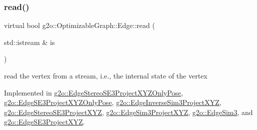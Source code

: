 \mbox{\label{classg2o_1_1_optimizable_graph_1_1_edge_a30cf69b762a06aa35e796d8af71632b0}} 
\subsubsection{\texorpdfstring{read()}{read()}}
{\footnotesize\ttfamily virtual bool g2o\+::\+Optimizable\+Graph\+::\+Edge\+::read (\begin{DoxyParamCaption}\item[{std\+::istream \&}]{is }\end{DoxyParamCaption})\hspace{0.3cm}{\ttfamily [pure virtual]}}



read the vertex from a stream, i.\+e., the internal state of the vertex 



Implemented in \mbox{\hyperlink{classg2o_1_1_edge_stereo_s_e3_project_x_y_z_only_pose_ae199c5428259a7d50e9897029ae9fd70}{g2o\+::\+Edge\+Stereo\+S\+E3\+Project\+X\+Y\+Z\+Only\+Pose}}, \mbox{\hyperlink{classg2o_1_1_edge_s_e3_project_x_y_z_only_pose_a28994ddf2cab7b61566ce55ad4b43388}{g2o\+::\+Edge\+S\+E3\+Project\+X\+Y\+Z\+Only\+Pose}}, \mbox{\hyperlink{classg2o_1_1_edge_inverse_sim3_project_x_y_z_ac229f31599a4f08eebe8f9b239d883f6}{g2o\+::\+Edge\+Inverse\+Sim3\+Project\+X\+YZ}}, \mbox{\hyperlink{classg2o_1_1_edge_stereo_s_e3_project_x_y_z_a59cdc820a694379a73a26d51d948db0e}{g2o\+::\+Edge\+Stereo\+S\+E3\+Project\+X\+YZ}}, \mbox{\hyperlink{classg2o_1_1_edge_sim3_project_x_y_z_aaf72b3f12f99f131e6c3395baf796fe9}{g2o\+::\+Edge\+Sim3\+Project\+X\+YZ}}, \mbox{\hyperlink{classg2o_1_1_edge_sim3_a6c7ad669fa04265475cbfdba3452fcbd}{g2o\+::\+Edge\+Sim3}}, and \mbox{\hyperlink{classg2o_1_1_edge_s_e3_project_x_y_z_a04200f3d6b7fbd47961df696f1ee34ed}{g2o\+::\+Edge\+S\+E3\+Project\+X\+YZ}}.

\mbox{\label{classg2o_1_1_optimizable_graph_1_1_edge_ac978364c99e36c7fced59ecb383ba171}} 
